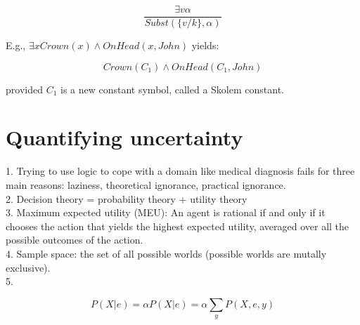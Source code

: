 \documentclass[12pt]{article}
\begin{document}
\begin{equation*}
  \frac {\exists v \alpha}{Subst(\{v/k\}, \alpha)}
\end{equation*}

E.g., $\exists x Crown(x) \land OnHead(x, John)$ yields:

\begin{equation*}
  Crown(C_1) \land OnHead(C_1, John)
\end{equation*}

provided $C_1$ is a new constant symbol, called a Skolem constant.

\section{Quantifying uncertainty}

1. Trying to use logic to cope with a domain like medical diagnosis fails for three main reasons: laziness, theoretical ignorance, practical ignorance. \\

2. Decision theory = probability theory + utility theory \\

3. Maximum expected utility (MEU): An agent is rational if and only if it chooses the action that yields the highest expected utility, averaged over all the possible outcomes of the action. \\

4. Sample space: the set of all possible worlds (possible worlds are mutally exclusive). \\

5.

\begin{equation}
  P(X|e) = \alpha P(X|e) = \alpha \sum_yP(X,e,y)
\end{equation}
\end{document}
